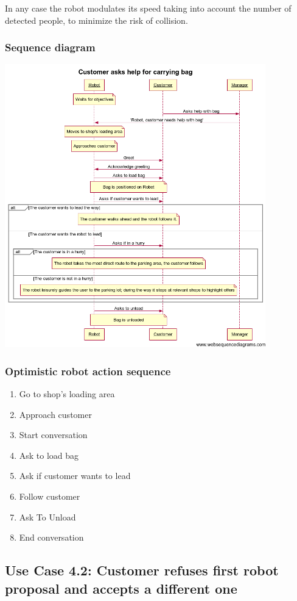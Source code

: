 In any case the robot modulates its speed taking into account the number of detected people, to minimize the risk of collision.

\subsubsection{Sequence diagram}

\includegraphics[width=0.85\textwidth]{bagUseCase}


\subsubsection{Optimistic robot action sequence}
\begin{enumerate}
\item Go to shop's loading area
\item Approach customer
\item Start conversation
\item Ask to load bag
\item Ask if customer wants to lead
\item Follow customer
\item Ask To Unload
\item End conversation
\end{enumerate}

\subsection{Use Case 4.2: Customer refuses first robot proposal and accepts a different one}

